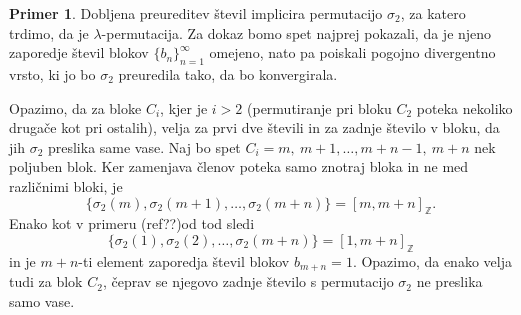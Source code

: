 \documentclass[12pt,a4paper,reqno]{amsart}
\theoremstyle{definition} %
\newtheorem{primer}[definicija]{Primer}
\theoremstyle{plain} %
\newcommand{\Z}{\mathbb Z}
\begin{document}
\begin{primer}
Dobljena preureditev števil implicira permutacijo $\sigma_2$, za katero trdimo, da je $\lambda$-permutacija. Za dokaz bomo spet najprej pokazali, da je njeno zaporedje števil blokov $\{b_n\}_{n=1}^{\infty}$ omejeno, nato pa poiskali pogojno divergentno vrsto, ki jo bo $\sigma_2$ preuredila tako, da bo konvergirala.

Opazimo, da za bloke $C_i$, kjer je $i>2$ (permutiranje pri bloku $C_2$ poteka nekoliko drugače kot pri ostalih), velja za prvi dve števili in za zadnje število v bloku, da jih $\sigma_2$ preslika same vase. Naj bo spet $C_i = m,\ m+1, \dots, m+n-1,\ m+n$ nek poljuben blok. Ker zamenjava členov poteka samo znotraj bloka in ne med različnimi bloki, je $$\{\sigma_2(m), \sigma_2(m+1), \ldots, \sigma_2(m+n) \}=[m,m+n]_{\Z}.$$ Enako kot v primeru (ref??)od tod sledi $$\{\sigma_2(1), \sigma_2(2), \ldots, \sigma_2(m+n) \}=[1,m+n]_{\Z}$$
in je $m+n$-ti element zaporedja števil blokov $b_{m+n}=1$. Opazimo, da enako velja tudi za blok $C_2$, čeprav se njegovo zadnje število s permutacijo $\sigma_2$ ne preslika samo vase.


\end{primer}
\end{document}
